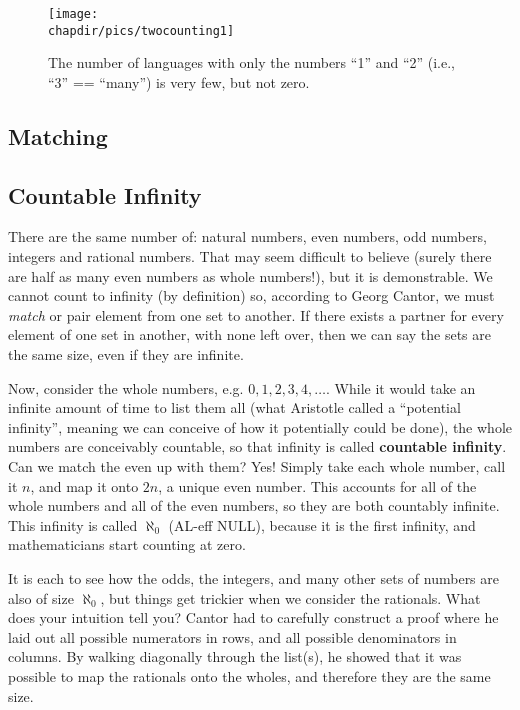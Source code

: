 
\begin{figure}
\begin{centering}
\texttt{[image: \\chapdir/pics/twocounting1]}
\caption[Languages with only two numbers]{The number of languages with only the numbers ``1'' and ``2'' (i.e., ``3'' == ``many'') is very few, but not zero.}
\end{centering}
\end{figure}

\subsection{Matching}


\subsection{Countable Infinity}
There are the same number of: natural numbers, even numbers, odd numbers, integers and
rational numbers.  That may seem difficult to believe (surely there are half as many even numbers
as whole numbers!), but it is demonstrable.  We cannot count to infinity (by definition) so,
according to Georg Cantor, we must \emph{match} or pair element from one set to another.
If there exists a partner for every element of one set in another, with none left over, then
we can say the sets are the same size, even if they are infinite.

Now, consider the whole numbers, e.g. $0, 1, 2, 3, 4, \dots$.  While it would take an infinite 
amount of time to list them all (what Aristotle called a ``potential infinity'', meaning we can
conceive of how it potentially could be done), the whole numbers are conceivably countable,
so that infinity is called \textbf{countable infinity}.  Can we match the even up with them?
Yes!  Simply take each whole number, call it $n$, and map it onto $2n$, a unique even 
number.  This accounts for all of the whole numbers and all of the even numbers, so 
they are both countably infinite.  This infinity is called $\aleph_0$ (AL-eff NULL), because
it is the first infinity, and mathematicians start counting at zero.

It is each to see how the odds, the integers, and many other sets of numbers are also
of size $\aleph_0$, but things get trickier when we consider the rationals.  What does
your intuition tell you?  Cantor had to carefully construct a proof where he laid out 
all possible numerators in rows, and all possible denominators in columns.  By walking
diagonally through the list(s), he showed that it was possible to map the rationals
onto the wholes, and therefore they are the same size.

